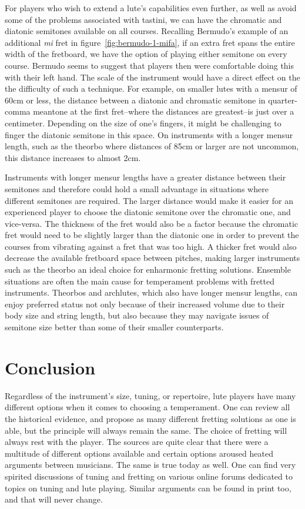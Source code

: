 For players who wish to extend a lute's capabilities even further, as well as avoid
some of the problems associated with tastini, we can have the chromatic and
diatonic semitones available on all courses. Recalling Bermudo's example of an
additional \textit{mi} fret in figure~\ref{fig:bermudo-1-mifa}, if an extra fret spans
the entire width of the fretboard, we have the option of playing either semitone on
every course. Bermudo seems to suggest that players then were comfortable doing this
with their left hand.  The scale of the instrument would have a direct effect on the
the difficulty of such a technique.  For example, on smaller lutes with a mensur of 60cm or less,
the distance between a diatonic and chromatic semitone in quarter-comma meantone
at the first fret--where the distances are greatest--is just over a centimeter.
Depending on the size of one's fingers, it might be challenging to finger the diatonic
semitone in this space.  On instruments with a longer mensur length, such as the
theorbo where distances of 85cm or larger are not uncommon, this distance increases to
almost 2cm.

Instruments with longer mensur lengths have a greater distance between their semitones
and therefore could hold a small advantage in situations where different semitones are
required. The larger distance would make it easier for an experienced player to choose
the diatonic semitone over the chromatic one, and vice-versa. The thickness of the fret
would also be a factor because the chromatic fret would need to be slightly larger than
the diatonic one in order to prevent the courses from vibrating against a fret that was
too high.  A thicker fret would also decrease the available fretboard space between
pitches, making larger instruments such as the theorbo an ideal choice for enharmonic
fretting solutions.  Ensemble situations are often the main cause for temperament
problems with fretted instruments.  Theorbos and archlutes, which also have longer
mensur lengths, can enjoy preferred status not only because of their increased volume
due to their body size and string length, but also because they may navigate issues of
semitone size better than some of their smaller counterparts.

\section{Conclusion}

Regardless of the instrument's size, tuning, or repertoire, lute players have many
different options when it comes to choosing a temperament.  One can review all the
historical evidence, and propose as many different fretting solutions as one is able,
but the principle will always remain the same. The choice of fretting will always rest
with the player. The sources are quite clear that there were a multitude of different
options available and certain options aroused heated arguments between musicians. The
same is true today as well. One can find very spirited discussions of tuning and
fretting on various online forums dedicated to topics on tuning and lute playing.
Similar arguments can be found in print too, and that will never change. \autocite{DD:4}

